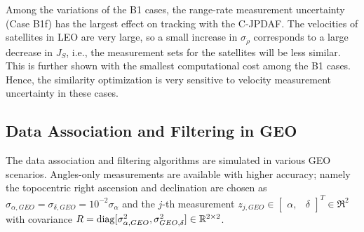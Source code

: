 Among the variations of the B1 cases, the range-rate measurement uncertainty (Case B1f) has the largest effect on tracking with the C-JPDAF.
The velocities of satellites in LEO are very large, so a small increase in $\sigma_{\dot\rho}$ corresponds to a large decrease in $J_S$, i.e., the measurement sets for the satellites will be less similar.  This is further shown with the smallest computational cost among the B1 cases.
Hence, the similarity optimization is very sensitive to velocity measurement uncertainty in these cases.




















\subsection{Data Association and Filtering in GEO}

The data association and filtering algorithms are simulated in various GEO scenarios.
Angles-only measurements are available with higher accuracy; namely the topocentric right ascension and declination are chosen as $\sigma_{\alpha,GEO}=\sigma_{\delta,GEO}=10^{-2}\sigma_\alpha$ and the $j$-th measurement $z_{j,GEO}\in\begin{bmatrix}\alpha, & \delta\end{bmatrix}^T\in\Re^2$ with covariance $R=\mathop{\mathrm{diag}}\nolimits[\sigma_{\alpha,GEO}^2, \sigma_{GEO,\delta}^2]\in\mathbb{R}^{2\times2}$.%













